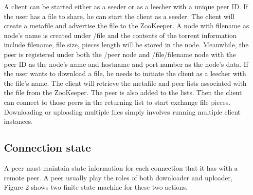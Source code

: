 \documentclass[conference]{IEEEtran}
\begin{document}
	A client can be started either as a seeder or as a leecher with a unique peer ID. If the user has a file to share, he can start the client as a seeder. The client will create a metafile and advertise the file to the ZooKeeper. A node with filename as node's name is created under /file and the contents of the torrent information include filename, file size,  pieces length will be stored in the node. Meanwhile, the peer is registered under both the /peer node and /file/filename node with the peer ID as the node's name and hostname and port number as the node's data. If the user wants to download a file, he needs to initiate the client as a leecher with the file's name. The client will retrieve the metafile and peer lists associated with the file from the ZooKeeper. The peer is also added to the lists. Then the client can connect to those peers in the returning list to start exchange file pieces. Downloading or uploading multiple files simply involves running multiple client instances.
	
	\subsection{Connection state}
	A peer must maintain state information for each connection that it has with a remote peer. A peer usually play the roles of both downloader and uploader, Figure 2 shows two finite state machine for these two actions.
	
\end{document}
